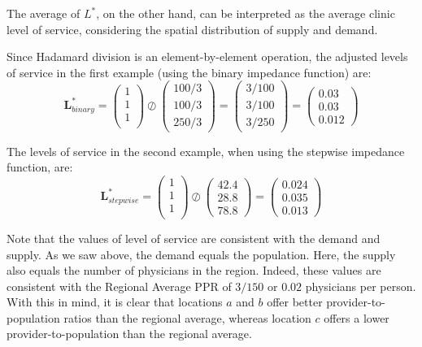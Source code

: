 \documentclass[10pt,letterpaper]{article}
\begin{document}
The average of \(L^*\), on the other hand, can be interpreted as the
average clinic level of service, considering the spatial distribution of
supply and demand.

Since Hadamard division is an element-by-element operation, the adjusted
levels of service in the first example (using the binary impedance
function) are: \[
\mathbf{L}^*_{binary} = \left( \begin{array}{c}
1 \\
1 \\
1 \\
\end{array}\right)\oslash
\left( \begin{array}{c}
100/3\\
100/3\\
250/3
\end{array} \right)=
\left( \begin{array}{c}
3/100\\
3/100\\
3/250
\end{array} \right)=
\left( \begin{array}{c}
0.03\\
0.03\\
0.012
\end{array} \right)
\]

The levels of service in the second example, when using the stepwise
impedance function, are: \[
\mathbf{L}^*_{stepwise} = \left( \begin{array}{c}
1 \\
1 \\
1 \\
\end{array}\right)\oslash
\left( \begin{array}{c}
42.4\\
28.8\\
78.8
\end{array} \right)=
\left( \begin{array}{c}
0.024\\
0.035\\
0.013
\end{array} \right)
\]

Note that the values of level of service are consistent with the demand
and supply. As we saw above, the demand equals the population. Here, the
supply also equals the number of physicians in the region. Indeed, these
values are consistent with the Regional Average PPR of \(3/150\) or
\(0.02\) physicians per person. With this in mind, it is clear that
locations \(a\) and \(b\) offer better provider-to-population ratios
than the regional average, whereas location \(c\) offers a lower
provider-to-population than the regional average.
\end{document}
